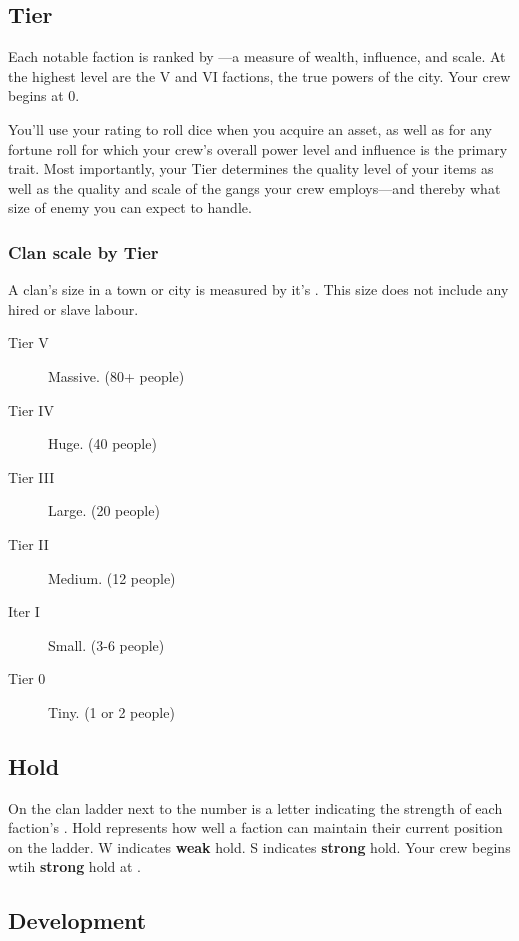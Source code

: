 \subsection{Tier}

Each notable faction is ranked by —a measure of wealth, influence, and scale. At the highest level are the  V and VI factions, the true powers of the city. Your crew begins at  0.

You’ll use your  rating to roll dice when you acquire an asset, as well as for any fortune roll for which your crew’s overall power level and influence is the primary trait. Most importantly, your Tier determines the quality level of your items as well as the quality and scale of the gangs your crew employs—and thereby what size of enemy you can expect to handle.

\subsubsection{Clan scale by Tier}

A clan's size in a town or city is measured by it's . This size does not include any hired or slave labour. 

\begin{description}
\item[Tier V] Massive. (80+ people)
\item[Tier IV] Huge. (40 people)
\item[Tier III] Large. (20 people)
\item[Tier II] Medium. (12 people)
\item[Iter I] Small. (3-6 people)
\item[Tier 0] Tiny. (1 or 2 people)
\end{description}

\subsection{Hold}

On the clan ladder next to the  number is a letter indicating the strength of each faction's . Hold represents how well a faction can maintain their current position on the ladder. W indicates \textbf{weak} hold. S indicates \textbf{strong} hold. Your crew begins wtih \textbf{strong} hold at .

\subsection{Development}

